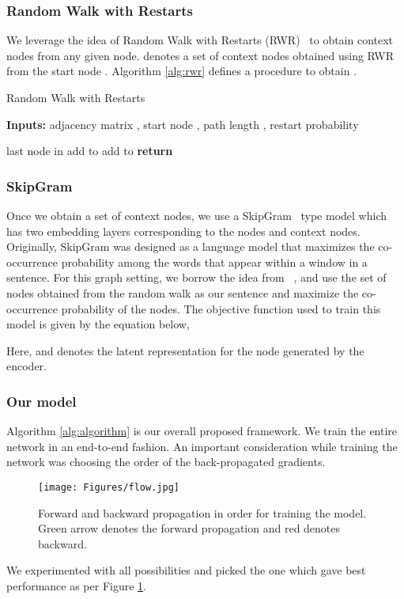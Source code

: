 \documentclass{article}
\begin{document}
\subsubsection{Random Walk with Restarts}
We leverage the idea of Random Walk with Restarts (RWR)~\cite{rwr} to obtain context nodes from any given node.  denotes a set of context nodes obtained using RWR from the start node . Algorithm \ref{alg:rwr} defines a procedure to obtain . 

\begin{algorithm}
\caption{Random Walk with Restarts}
\label{alg:rwr}
\begin{algorithmic}
\State \textbf{Inputs: }{adjacency matrix , start node , path length , restart probability }\\
\State  {}

\State  last node in 
\State  {}
\If{}
    \State add  to 
  \Else
    \State add  to  
\EndIf
\EndWhile
\State \textbf{return} 
\EndProcedure
\end{algorithmic}
\end{algorithm}


\subsubsection{SkipGram}
Once we obtain a set of context nodes, we use a SkipGram~\cite{mikolov2013efficient} type model which has two embedding layers corresponding to the nodes and context nodes. Originally, SkipGram was designed as a language model that maximizes the co-occurrence probability among the words that appear within a window in a sentence. For this graph setting, we borrow the idea from ~\cite{perozzi2014deepwalk}, and use the set of nodes obtained from the random walk as our sentence and maximize the co-occurrence probability of the nodes. The objective function used to train this model is given by the equation below,

Here,  and  denotes the latent representation for the node  generated by the encoder.

\subsubsection{Our model}
Algorithm \ref{alg:algorithm} is our overall proposed framework. We train the entire network in an end-to-end fashion. An important consideration while training the network was choosing the order of the back-propagated gradients.
\begin{figure}[h]
\centering
\texttt{[image: Figures/flow.jpg]}
\caption{Forward and backward propagation in order for training the model. Green arrow denotes the forward propagation and red denotes backward.\label{flow}}
\end{figure}
We experimented with all possibilities and picked the one which gave best performance as per Figure \ref{flow}. 
\end{document}
